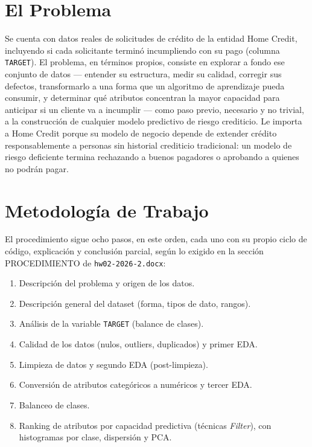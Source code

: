 \documentclass[conference]{IEEEtran}
\begin{document}
\section{El Problema}

Se cuenta con datos reales de solicitudes de crédito de la entidad Home
Credit, incluyendo si cada solicitante terminó incumpliendo con su pago
(columna \texttt{TARGET}). El problema, en términos propios, consiste en
explorar a fondo ese conjunto de datos --- entender su estructura, medir
su calidad, corregir sus defectos, transformarlo a una forma que un
algoritmo de aprendizaje pueda consumir, y determinar qué atributos
concentran la mayor capacidad para anticipar si un cliente va a incumplir
--- como paso previo, necesario y no trivial, a la construcción de
cualquier modelo predictivo de riesgo crediticio. Le importa a Home
Credit porque su modelo de negocio depende de extender crédito
responsablemente a personas sin historial crediticio tradicional: un
modelo de riesgo deficiente termina rechazando a buenos pagadores o
aprobando a quienes no podrán pagar.

\section{Metodología de Trabajo}

El procedimiento sigue ocho pasos, en este orden, cada uno con su propio
ciclo de código, explicación y conclusión parcial, según lo exigido en la
sección PROCEDIMIENTO de \texttt{hw02-2026-2.docx}:

\begin{enumerate}
\item Descripción del problema y origen de los datos.
\item Descripción general del dataset (forma, tipos de dato, rangos).
\item Análisis de la variable \texttt{TARGET} (balance de clases).
\item Calidad de los datos (nulos, outliers, duplicados) y primer EDA.
\item Limpieza de datos y segundo EDA (post-limpieza).
\item Conversión de atributos categóricos a numéricos y tercer EDA.
\item Balanceo de clases.
\item Ranking de atributos por capacidad predictiva (técnicas \emph{Filter}),
      con histogramas por clase, dispersión y PCA.
\end{enumerate}
\end{document}
